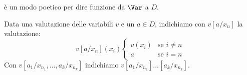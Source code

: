 \begin{definition}
     è un modo poetico per dire funzione da $\Var$ a $D$.
\end{definition}

\begin{notation}
    Data una valutazione delle variabili $v$ e un $a \in D$, indichiamo con $v[a/x_n]$ la valutazione:
    \[ v[a/x_n](x_i)\begin{cases}
        v(x_i) &\text{se $i \neq n$} \\
        a &\text{se $i = n$}
    \end{cases}
    \]
    Con $v[a_1/x_{n_1},\ldots,a_k/x_{n_k}]$ indichiamo $v[a_1/x_{n_1}]\ldots[a_k/x_{n_k}]$.
\end{notation}


